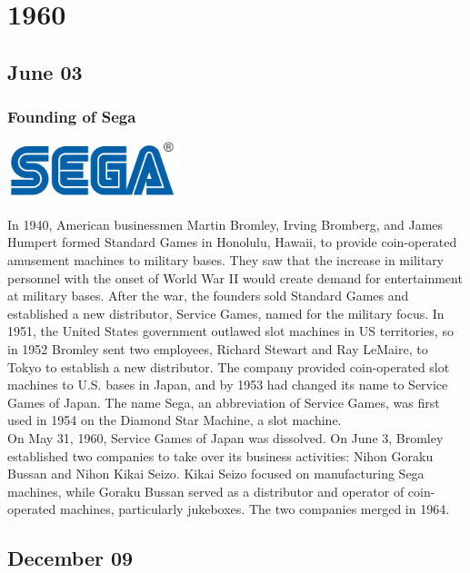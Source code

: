 \documentclass[11pt]{report}
\begin{document}
\chapter{1960}
\section{June 03}
\subsection{Founding of Sega}
\vspace{2mm}\begin{center}\includegraphics[width=5cm]{./img/segaLogo.jpg}\end{center}
In 1940, American businessmen Martin Bromley, Irving Bromberg, and James Humpert formed Standard Games in Honolulu, Hawaii, to provide coin-operated amusement machines to military bases. They saw that the increase in military personnel with the onset of World War II would create demand for entertainment at military bases. After the war, the founders sold Standard Games and established a new distributor, Service Games, named for the military focus. In 1951, the United States government outlawed slot machines in US territories, so in 1952 Bromley sent two employees, Richard Stewart and Ray LeMaire, to Tokyo to establish a new distributor. The company provided coin-operated slot machines to U.S. bases in Japan, and by 1953 had changed its name to Service Games of Japan. The name Sega, an abbreviation of Service Games, was first used in 1954 on the Diamond Star Machine, a slot machine.\\
\indent On May 31, 1960, Service Games of Japan was dissolved. On June 3, Bromley established two companies to take over its business activities: Nihon Goraku Bussan and Nihon Kikai Seizo. Kikai Seizo focused on manufacturing Sega machines, while Goraku Bussan served as a distributor and operator of coin-operated machines, particularly jukeboxes. The two companies merged in 1964.
\section{December 09}
\end{document}
